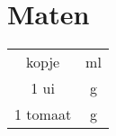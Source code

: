 \section{Maten}

\begin{tabular}{|c|c|}
    \hline
    \unit[1]{kopje} & \unit[150]{ml} \\
    1 ui &  \unit[75]{g} \\
    1 tomaat & \unit[70]{g} \\
    \hline
\end{tabular}